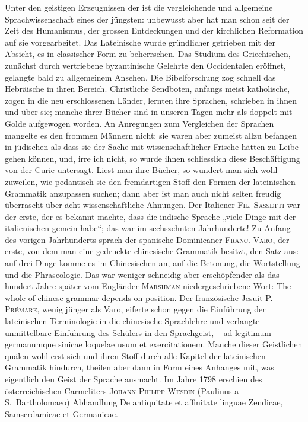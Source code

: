 \label{I.IV.neuerezeit}
Unter den geistigen Erzeugnissen der  ist die vergleichende und allgemeine Sprachwissenschaft eines der jüngsten: unbewusst aber hat man schon seit der Zeit des Humanismus, der grossen Entdeckungen und der kirchlichen Reformation auf sie vorgearbeitet. \label{fp.25} Das Lateinische wurde gründlicher getrieben mit der Absicht, es in classischer Form zu beherrschen. Das Studium des Griechischen, zunächst durch vertriebene byzantinische Gelehrte den Occidentalen eröffnet, gelangte bald zu allgemeinem Ansehen. Die Bibelforschung zog schnell das Hebräische in ihren Bereich. Christliche Sendboten, anfangs meist katholische, zogen in die neu erschlossenen Länder, lernten ihre Sprachen, schrieben in ihnen und über sie; manche ihrer Bücher sind in unseren Tagen mehr als doppelt mit Golde aufgewogen worden. An Anregungen zum Vergleichen der Sprachen mangelte es den frommen Männern nicht; sie waren aber zumeist allzu befangen in jüdischen  als dass sie der Sache mit wissenschaftlicher Frische hätten zu Leibe gehen können, und, irre ich nicht, so wurde ihnen schliesslich diese Beschäftigung von der Curie untersagt. Liest man ihre Bücher, so wundert man sich wohl zuweilen, wie pedantisch sie den fremdartigen Stoff den Formen der lateinischen Grammatik anzupassen suchen; dann aber ist man auch nicht selten freudig überrascht über ächt wissenschaftliche Ahnungen. Der Italiener \textsc{Fil. Sassetti} war der erste, der es bekannt machte, dass die indische Sprache „viele Dinge mit der italienischen gemein habe“; das war im sechszehnten Jahrhunderte! Zu Anfang des vorigen Jahrhunderts sprach der spanische Dominicaner \textsc{Franc. Varo}, der erste, von dem man eine gedruckte chinesische Grammatik besitzt, den Satz aus: auf drei Dinge komme es im Chinesischen an, auf die Betonung, die Wortstellung und die Phraseologie. Das war weniger schneidig aber erschöpfender als das hundert Jahre später vom Engländer \textsc{Marshman} niedergeschriebene Wort: The whole of chinese grammar depends on position. Der französische Jesuit \textsc{P. Prémare}, wenig jünger als Varo, eiferte schon gegen die Einführung der lateinischen Terminologie in die chinesische Sprachlehre und verlangte unmittelbare Ein\-\label{sp.26}führung des Schülers in den Sprachgeist, – ad legitimum germanumque sinicae loquelae usum et exercitationem. Manche dieser Geistlichen quälen wohl erst sich und ihren Stoff durch alle Kapitel der lateinischen Grammatik hindurch, theilen aber dann in Form eines Anhanges mit, was eigentlich den Geist der Sprache ausmacht. Im Jahre 1798 erschien des österreichischen Carmeliters \textsc{Johann Philipp Wesdin} (Paulinus a S.~Bartholomaeo) Abhandlung De antiquitate et affinitate linguae Zendicae, Samscrdamicae et Germanicae.

